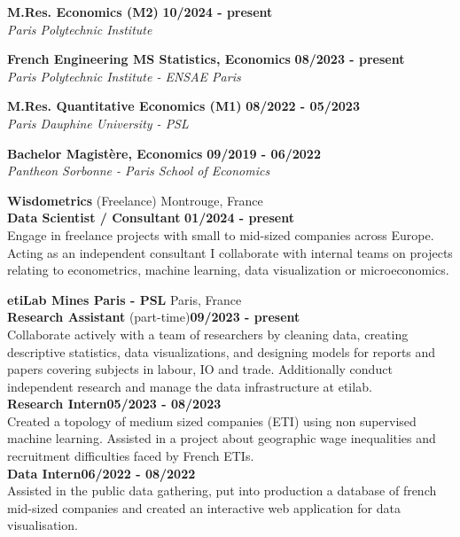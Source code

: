 \begin{flushleft}
\raisebox{-.6ex}{HIGHER EDUCATION} \hrulefill
\end{flushleft}

    \noindent\textbf{M.Res. \textbar\space Economics (M2)}
    \hfill
    \textbf{10/2024 - present} \\
    \emph{Paris Polytechnic Institute} 

    \noindent\textbf{French Engineering MS \textbar\space Statistics,  Economics}
    \hfill
    \textbf{08/2023 - present} \\
    \emph{Paris Polytechnic Institute - ENSAE Paris}

    \noindent\textbf{M.Res. \textbar\space Quantitative Economics (M1)}
    \hfill
    \textbf{08/2022 - 05/2023} \\
    \emph{Paris Dauphine University - PSL}

    \noindent\textbf{Bachelor \textbar\space Magistère, Economics}
    \hfill
    \textbf{09/2019 - 06/2022} \\
    \emph{Pantheon Sorbonne - Paris School of Economics}
	

\begin{flushleft}
\raisebox{-.6ex}{WORK \& RESEARCH EXPERIENCE} \hrulefill
\end{flushleft}
	\noindent\textbf{Wisdometrics} (Freelance) \hfill Montrouge, France\\[0.1cm]
    \textbf{Data Scientist / Consultant} \hfill \textbf{01/2024  - present} \\
	Engage in freelance projects with small to mid-sized companies across Europe. Acting as an independent consultant I collaborate with internal teams on projects relating to econometrics, machine learning, data visualization or microeconomics.
    
    \vspace{0.15cm}
    
    \noindent\textbf{etiLab Mines Paris - PSL} \hfill Paris, France\\[0.1cm]
    \textbf{Research Assistant} (part-time)\hfill \textbf{09/2023 - present} \\
    Collaborate actively with a team of researchers by cleaning data, creating descriptive statistics, data visualizations, and designing models for reports and papers covering subjects in labour, IO and trade. Additionally conduct independent research and manage the data infrastructure at etilab. \\
    \textbf{Research Intern}\hfill \textbf{05/2023 - 08/2023} \\
    Created a topology of medium sized companies (ETI) using non supervised machine learning. Assisted in a project about geographic wage inequalities and recruitment difficulties faced by French ETIs. \\[0.1cm]
    \textbf{Data Intern}\hfill \textbf{06/2022 - 08/2022} \\
    Assisted in the public data gathering, put into production a database of french mid-sized companies and created an interactive web application for data visualisation.

